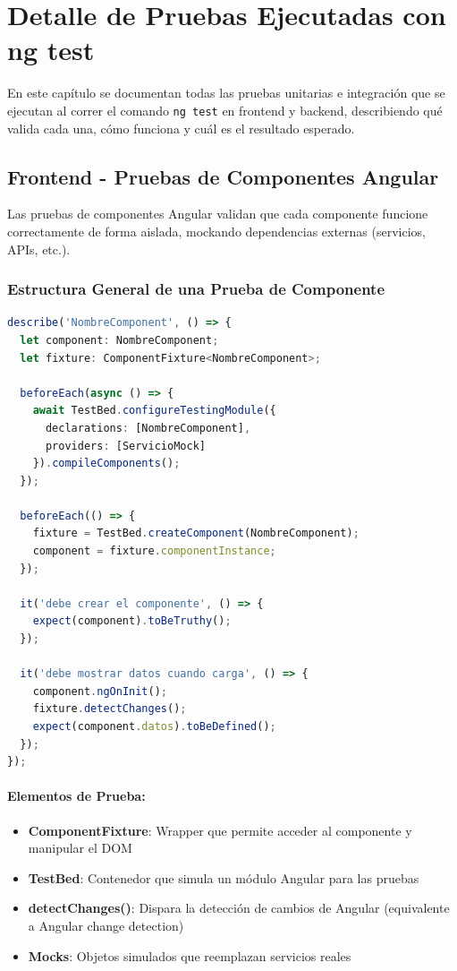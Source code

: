 \section{Detalle de Pruebas Ejecutadas con ng test}

En este capítulo se documentan todas las pruebas unitarias e integración que se ejecutan al correr el comando \texttt{ng test} en frontend y backend, describiendo qué valida cada una, cómo funciona y cuál es el resultado esperado.

\subsection{Frontend - Pruebas de Componentes Angular}

Las pruebas de componentes Angular validan que cada componente funcione correctamente de forma aislada, mockando dependencias externas (servicios, APIs, etc.).

\subsubsection{Estructura General de una Prueba de Componente}

\begin{lstlisting}[language=TypeScript, caption=Estructura base de prueba Angular]
describe('NombreComponent', () => {
  let component: NombreComponent;
  let fixture: ComponentFixture<NombreComponent>;

  beforeEach(async () => {
    await TestBed.configureTestingModule({
      declarations: [NombreComponent],
      providers: [ServicioMock]
    }).compileComponents();
  });

  beforeEach(() => {
    fixture = TestBed.createComponent(NombreComponent);
    component = fixture.componentInstance;
  });

  it('debe crear el componente', () => {
    expect(component).toBeTruthy();
  });

  it('debe mostrar datos cuando carga', () => {
    component.ngOnInit();
    fixture.detectChanges();
    expect(component.datos).toBeDefined();
  });
});
\end{lstlisting}

\paragraph{Elementos de Prueba:}
\begin{itemize}
\item \textbf{ComponentFixture}: Wrapper que permite acceder al componente y manipular el DOM
\item \textbf{TestBed}: Contenedor que simula un módulo Angular para las pruebas
\item \textbf{detectChanges()}: Dispara la detección de cambios de Angular (equivalente a Angular change detection)
\item \textbf{Mocks}: Objetos simulados que reemplazan servicios reales
\end{itemize}

